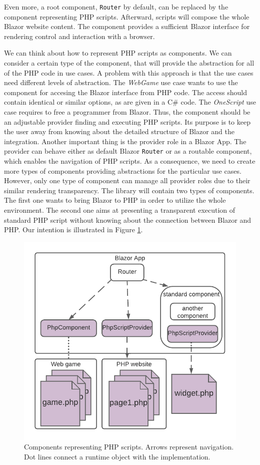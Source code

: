 Even more, a root component, \texttt{Router} by default, can be replaced by the component representing PHP scripts.
Afterward, scripts will compose the whole Blazor website content.
The component provides a sufficient Blazor interface for rendering control and interaction with a browser. 
\par
We can think about how to represent PHP scripts as components.
We can consider a certain type of the component, that will provide the abstraction for all of the PHP code in use cases.
A problem with this approach is that the use cases need different levels of abstraction.
The \textit{WebGame} use case wants to use the component for accesing the Blazor interface from PHP code.
The access should contain identical or similar options, as are given in a C\# code.
The \textit{OneScript} use case requires to free a programmer from Blazor.
Thus, the component should be an adjustable provider finding and executing PHP scripts.
Its purpose is to keep the user away from knowing about the detailed structure of Blazor and the integration.
Another important thing is the provider role in a Blazor App.
The provider can behave either as default Blazor \texttt{Router} or as a routable component, which enables the navigation of PHP scripts.
As a consequence, we need to create more types of components providing abstractions for the particular use cases.
However, only one type of component can manage all provider roles due to their similar rendering transparency.
The library will contain two types of components.
The first one wants to bring Blazor to PHP in order to utilize the whole environment.
The second one aims at presenting a transparent execution of standard PHP script without knowing about the connection between Blazor and PHP.
Our intention is illustrated in Figure \ref{img12:component}.
\par
\begin{figure}
\centering
\includegraphics[scale=0.9]{./img/Components}
\caption{Components representing PHP scripts. Arrows represent navigation. 
Dot lines connect a runtime object with the implementation.
}
\label{img12:component}
\end{figure} 
